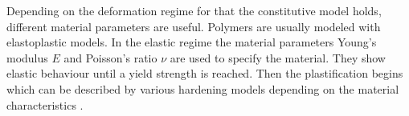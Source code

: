 Depending on the deformation regime for that the constitutive model holds, different material parameters are useful. Polymers are usually modeled with elastoplastic models. In the elastic regime the material  parameters  Young's modulus $E$ and Poisson's ratio $\nu$ are used to specify the material. They show elastic behaviour until a yield strength is reached. 
Then the plastification begins which can be described by various hardening models depending on the material characteristics \cite{mergheim_lecture_nodate}. 











